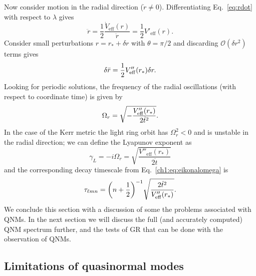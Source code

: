 Now consider motion in the radial direction ($\dot{r} \neq 0$).
Differentiating Eq.~\ref{eq:rdot} with respect to $\lambda$ gives
\begin{equation}
	\ddot{r} = \frac{1}{2} \frac{\dot{V}_\mathrm{eff}(r)}{\dot{r}} = \frac{1}{2}V'_\mathrm{eff}(r).
\end{equation}
Consider small perturbations $r = r_* + \delta r$ with $\theta = \pi/2$ and discarding $\mathcal{O}(\delta r^2)$ terms gives
\begin{equation}
	\delta \ddot{r} = \frac{1}{2}V''_{\rm eff}(r_*)\delta r.
\end{equation}
Looking for periodic solutions, the frequency of the radial oscillations (with respect to coordinate time) is given by
\begin{align}
	\Omega_{r} = \sqrt{-\frac{V''_{\rm eff}(r_*)}{2\dot{t}^2}}.
\end{align}
In the case of the Kerr metric the light ring orbit has $\Omega_r^2 < 0$ and is unstable in the radial direction; we can define the Lyapunov exponent as
\begin{equation}
    \gamma_L = -i\Omega_r = \sqrt{\frac{V''_\mathrm{eff}(r_*)}{2\dot{t}}}
\end{equation}
and the corresponding decay timescale from Eq.~\ref{ch1:eq:eikonalomega} is
\begin{equation}
    \tau_{\ell m n} = \qty(n + \frac{1}{2})^{-1} \sqrt{\frac{2\dot{t}^2}{V''_\mathrm{eff}(r_*)}}.
\end{equation}
We conclude this section with a discussion of some the problems associated with QNMs.
In the next section we will discuss the full (and accurately computed) QNM spectrum further, and the tests of GR that can be done with the observation of QNMs.

\subsection{Limitations of quasinormal modes}
\label{ch1:sec:limitations}



